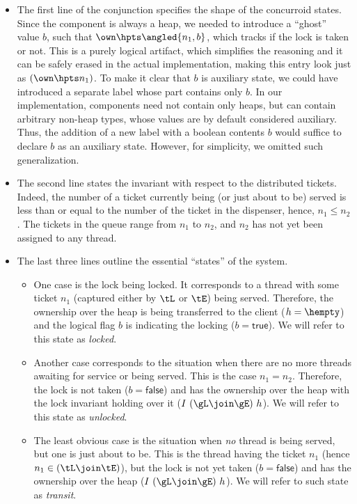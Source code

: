 \begin{itemize}

\item The first line of the conjunction specifies the shape of the
  concurroid states. Since the \joint component is always a heap, we
  needed to introduce a ``ghost'' value $b$, such that $\own \hpts
  \angled{n_1, b}$, which tracks if the lock is taken or not.  This is
  a purely logical artifact, which simplifies the reasoning and it can
  be safely erased in the actual implementation, making this entry
  look just as $(\own \hpts n_1)$. To make it clear that $b$ is
  auxiliary state, we could have introduced a separate label whose
  \joint part contains only $b$. In our implementation, \joint
  components need not contain only heaps, but can contain arbitrary
  non-heap types, whose values are by default considered
  auxiliary. Thus, the addition of a new label with a boolean contents
  $b$ would suffice to declare $b$ as an auxiliary state. However, for
  simplicity, we omitted such generalization.

\item The second line states the invariant with respect to the
  distributed tickets. Indeed, the number of a ticket currently being
  (or just about to be) served is less than or equal to the number of
  the ticket in the dispenser, hence, $n_1 \le n_2$. The tickets in
  the queue range from $n_1$ to $n_2$, and $n_2$ has not yet been
  assigned to any thread.

\item The last three lines outline the essential ``states'' of the
  system. 

\begin{itemize}

\item One case is the lock being locked. It corresponds to a thread
  with some ticket $n_1$ (captured either by $\tL$ or $\tE$) being
  served. Therefore, the ownership over the heap is being transferred
  to the client ($h = \hempty$) and the logical flag $b$ is indicating
  the locking ($b = \mathsf{true}$). We will refer to this state as
  \emph{locked}.

  \item Another case corresponds to the situation when there are no
    more threads awaiting for service or being served. This is the
    case $n_1 = n_2$. Therefore, the lock is not taken ($b =
    \mathsf{false}$) and has the ownership over the heap with the lock
    invariant holding over it ($I~(\gL \join \gE)\ h$). We will refer
    to this state as \emph{unlocked}.

  \item The least obvious case is the situation when \emph{no} thread
    is being served, but one is just about to be. This is the thread
    having the ticket $n_1$ (hence $n_1 \in (\tL \join \tE)$), but the
    lock is not yet taken ($b = \mathsf{false}$) and has the
    ownership over the heap ($I~(\gL \join \gE)\ h$). We will refer to
    such state as \emph{transit}. 

\end{itemize}

\end{itemize}

